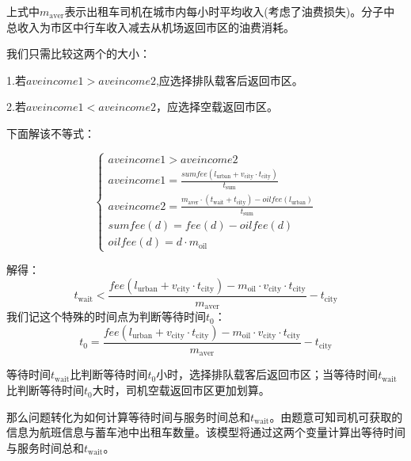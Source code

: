 \documentclass[withoutpreface,bwprint]{cumcmthesis} %
\begin{document}
上式中$m_{\mathrm{aver}}$表示出租车司机在城市内每小时平均收入(考虑了油费损失)。分子中总收入为市区中行车收入减去从机场返回市区的油费消耗。\par
\par

我们只需比较这两个的大小：

1.若$aveincome1>aveincome2$,应选择排队载客后返回市区。

2.若$aveincome1<aveincome2$，应选择空载返回市区。

下面解该不等式：\par
\begin{equation}
	\left\{
	\begin{array}{l}
		aveincome1>aveincome2                                                                                                       \\
		aveincome1=\frac{sumfee(l_{\mathrm{urban}}+v_{\mathrm{city}} \cdot t_{\mathrm{city}})}{t_{ \mathrm{sum}}}                   \\
		aveincome2=\frac{m_{\mathrm{aver}}\cdot(t_{\mathrm{wait}}+t_{\mathrm{city}})-oilfee(l_{\mathrm{urban}})}{t_{ \mathrm{sum}}} \\
		sumfee(d)=fee(d)-oilfee(d)                                                                                                  \\
		oilfee(d)=d\cdot m_{\mathrm{oil}}
	\end{array} \right.
\end{equation}

解得：
\begin{equation}
	t_{\mathrm{wait}}< \frac{fee(l_{\mathrm{urban}}+v_{\mathrm{city}} \cdot t_{\mathrm{city}})-m_{\mathrm{oil}}\cdot v_{\mathrm{city}} \cdot t_{\mathrm{city}}}{m_{\mathrm{aver}}} -t_{\mathrm{city}}
\end{equation}
我们记这个特殊的时间点为判断等待时间$t_0$：
\begin{equation}
	t_0=  \frac{fee(l_{\mathrm{urban}}+v_{\mathrm{city}} \cdot t_{\mathrm{city}})-m_{\mathrm{oil}}\cdot v_{\mathrm{city}} \cdot t_{\mathrm{city}}}{m_{\mathrm{aver}}} -t_{\mathrm{city}}
\end{equation}\par
等待时间$t_{\mathrm{wait}}$比判断等待时间$t_0$小时，选择排队载客后返回市区；当等待时间$t_{\mathrm{wait}}$比判断等待时间$t_0$大时，司机空载返回市区更加划算。\par

那么问题转化为如何计算等待时间与服务时间总和$t_{\mathrm{wait}}$。由题意可知司机可获取的信息为航班信息与蓄车池中出租车数量。该模型将通过这两个变量计算出等待时间与服务时间总和$t_{\mathrm{wait}}$。
\end{document}
